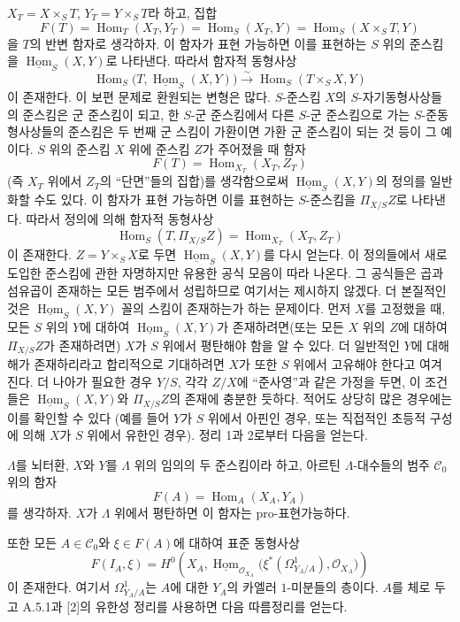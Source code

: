 $X_T=X\times_ST$, $Y_T=Y\times_ST$라 하고, 집합
\[
  F(T)=\operatorname{Hom}_T(X_T,Y_T)
      =\operatorname{Hom}_S(X_T,Y)
      =\operatorname{Hom}_S(X\times_ST,Y)
\]
을 $T$의 반변 함자로 생각하자. 이 함자가 표현 가능하면 이를 표현하는
$S$ 위의 준스킴을 $\underline{\operatorname{Hom}}_S(X,Y)$로 나타낸다.
따라서 함자적 동형사상
\[
  \operatorname{Hom}_S
  \bigl(T,\underline{\operatorname{Hom}}_S(X,Y)\bigr)
  \xrightarrow{\sim}
  \operatorname{Hom}_S(T\times_SX,Y)
\]
이 존재한다. 이 보편 문제로 환원되는 변형은 많다. $S$-준스킴 $X$의
$S$-자기동형사상들의 준스킴은 군 준스킴이 되고, 한 $S$-군 준스킴에서
다른 $S$-군 준스킴으로 가는 $S$-준동형사상들의 준스킴은 두 번째 군
스킴이 가환이면 가환 군 준스킴이 되는 것 등이 그 예이다.
$S$ 위의 준스킴 $X$ 위에 준스킴 $Z$가 주어졌을 때 함자
\[
  F(T)=\operatorname{Hom}_{X_T}(X_T,Z_T)
\]
(즉 $X_T$ 위에서 $Z_T$의 ``단면''들의 집합)를 생각함으로써
$\underline{\operatorname{Hom}}_S(X,Y)$의 정의를 일반화할 수도 있다.
이 함자가 표현 가능하면 이를 표현하는 $S$-준스킴을 $\Pi_{X/S}Z$로
나타낸다. 따라서 정의에 의해 함자적 동형사상
\[
  \operatorname{Hom}_S(T,\Pi_{X/S}Z)
  =\operatorname{Hom}_{X_T}(X_T,Z_T)
\]
이 존재한다. $Z=Y\times_SX$로 두면
$\underline{\operatorname{Hom}}_S(X,Y)$를 다시 얻는다. 이 정의들에서
새로 도입한 준스킴에 관한 자명하지만 유용한 공식 모음이 따라 나온다.
그 공식들은 곱과 섬유곱이 존재하는 모든 범주에서 성립하므로 여기서는
제시하지 않겠다. 더 본질적인 것은
$\underline{\operatorname{Hom}}_S(X,Y)$ 꼴의 스킴이 존재하는가 하는
문제이다. 먼저 $X$를 고정했을 때, 모든 $S$ 위의 $Y$에 대하여
$\underline{\operatorname{Hom}}_S(X,Y)$가 존재하려면(또는 모든 $X$
위의 $Z$에 대하여 $\Pi_{X/S}Z$가 존재하려면) $X$가 $S$ 위에서 평탄해야
함을 알 수 있다. 더 일반적인 $Y$에 대해 해가 존재하리라고 합리적으로
기대하려면 $X$가 또한 $S$ 위에서 고유해야 한다고 여겨진다. 더 나아가
필요한 경우 $Y/S$, 각각 $Z/X$에 ``준사영''과 같은 가정을 두면, 이
조건들은 $\underline{\operatorname{Hom}}_S(X,Y)$와 $\Pi_{X/S}Z$의
존재에 충분한 듯하다. 적어도 상당히 많은 경우에는 이를 확인할 수 있다
(예를 들어 $Y$가 $S$ 위에서 아핀인 경우, 또는 직접적인 초등적 구성에
의해 $X$가 $S$ 위에서 유한인 경우). 정리 1과 2로부터 다음을 얻는다.

 $\Lambda$를 뇌터환, $X$와 $Y$를 $\Lambda$ 위의
임의의 두 준스킴이라 하고, 아르틴 $\Lambda$-대수들의 범주
$\mathcal C_0$ 위의 함자
\[
  F(A)=\operatorname{Hom}_A(X_A,Y_A)
\]
를 생각하자. $X$가 $\Lambda$ 위에서 평탄하면 이 함자는
pro-표현가능하다.

또한 모든 $A\in\mathcal C_0$와 $\xi\in F(A)$에 대하여 표준 동형사상
\[
  F(I_A,\xi)=H^0\!\left(
    X_A,
    \underline{\operatorname{Hom}}_{\mathcal O_{X_A}}
    \bigl(\xi^*(\Omega^1_{Y_A/A}),\mathcal O_{X_A}\bigr)
  \right)
\]
이 존재한다. 여기서 $\Omega^1_{Y_A/A}$는 $A$에 대한 $Y_A$의 카엘러
$1$-미분들의 층이다. $A$를 체로 두고 A.5.1과 [2]의 유한성 정리를
사용하면 다음 따름정리를 얻는다.

